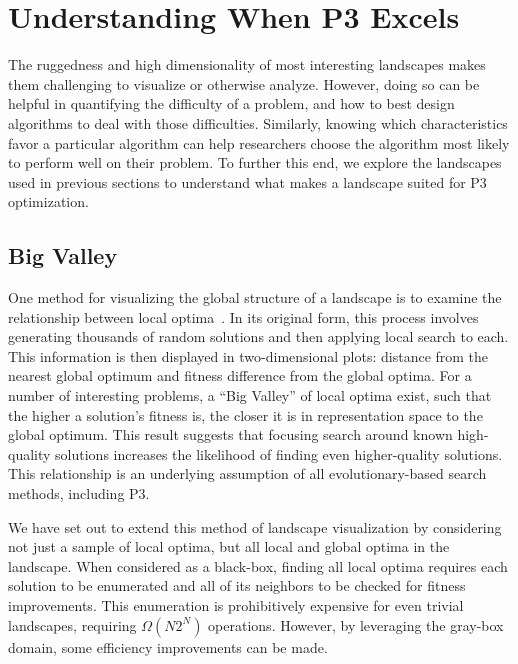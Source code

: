 \chapter{Understanding When P3 Excels}
The ruggedness and high dimensionality of most interesting landscapes makes them challenging
to visualize or otherwise analyze. However, doing so can be helpful in
quantifying the difficulty of a problem, and how to best design algorithms to deal
with those difficulties. 
Similarly, knowing which characteristics favor
a particular
algorithm can help researchers choose the algorithm
most likely to perform well on their problem. To further this end, we
explore the landscapes used in previous sections to understand
what makes a landscape suited for P3 optimization.

\section{Big Valley}
One method for visualizing the global structure of a landscape
is to examine the relationship between local optima~\cite{boese:1994:bigvalley}.
In its original form, this process involves generating thousands of random solutions and then applying
local search to each. This information is then displayed in two-dimensional plots:
distance from the nearest
global
optimum and fitness difference from the global optima.
For a number of interesting problems, a ``Big Valley'' of
local optima exist, such that the higher a solution's fitness is, the closer it is
in representation space to the global optimum. This result suggests that
focusing search around known high-quality solutions increases the likelihood of finding even
higher-quality solutions. This relationship is an underlying assumption
of all evolutionary-based search methods, including P3.

We have set out to extend this method of landscape visualization by considering not
just a sample of local optima, but all local and global optima in the landscape.
When considered as a black-box, finding all local optima requires each solution to be enumerated and all of its
neighbors to be checked for fitness improvements. This enumeration is prohibitively expensive for
even trivial landscapes, requiring $\Omega(N2^N)$ operations.
However, by leveraging the gray-box domain, some efficiency improvements can be made.


